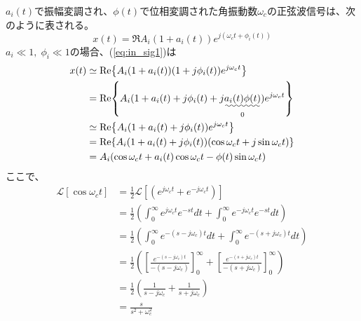 \documentclass[book]{jlreq}
\begin{document}
$a_i(t)$で振幅変調され、$\phi(t)$で位相変調された角振動数$\omega_c$の正弦波信号は、次のように表される。
%
\begin{equation}
    x(t) = \Re{A_i(1+a_i(t))e^{j(\omega_c t+\phi_i(t))}}
    \label{eq:in_sig1}
\end{equation}
%
$a_i \ll 1,\; \phi_i \ll 1$の場合、(\ref{eq:in_sig1})は
%
\begin{align}
    x(t) & \simeq \Re{A_i(1 + a_i(t))(1 + j\phi_i(t))e^{j\omega_c t}}                                \notag \\
         & = \Re{A_i(1 + a_i(t) + j\phi_i(t) + j\underset{0}{\uwave{a_i(t)\phi(t)}})e^{j\omega_c t}} \notag \\
         & \simeq \Re{A_i(1 + a_i(t) + j\phi_i(t))e^{j\omega_c t}}\notag                                    \\
         & = \Re{A_i(1 + a_i(t) + j\phi_i(t))(\cos\omega_c t + j\sin\omega_c t)} \notag                     \\
         & = A_i(\cos\omega_c t + a_i(t)\cos\omega_c t - \phi(t)\sin\omega_c t)
    \label{eq:in_sig2}
\end{align}
%
ここで、
%
\begin{equation}
    \begin{split}
        \mathcal{L} [\cos\omega_c t] &= \frac{1}{2}\mathcal{L}[(e^{j\omega_c t}+e^{-j\omega_c t})]\\
        &= \frac{1}{2}\left(\int_0^\infty e^{j\omega_c t} e^{-st} dt + \int_0^\infty e^{-j\omega_c t} e^{-st} dt \right)\\
        &= \frac{1}{2}\left(\int_0^\infty e^{-(s-j\omega_c) t} dt + \int_0^\infty e^{-(s+j\omega_c) t} dt \right)\\
        &= \frac{1}{2}\left(\left[\frac{e^{-(s-j\omega_c) t}}{-(s-j\omega_c)}\right]_0^\infty +
        \left[\frac{e^{-(s+j\omega_c) t}}{-(s+j\omega_c)}\right]_0^\infty \right)\\
        &= \frac{1}{2}\left( \frac{1}{s-j\omega_c}+\frac{1}{s+j\omega_c}\right)\\
        &= \frac{s}{s^2+\omega_c^2}
    \end{split}
\end{equation}
%
\end{document}
